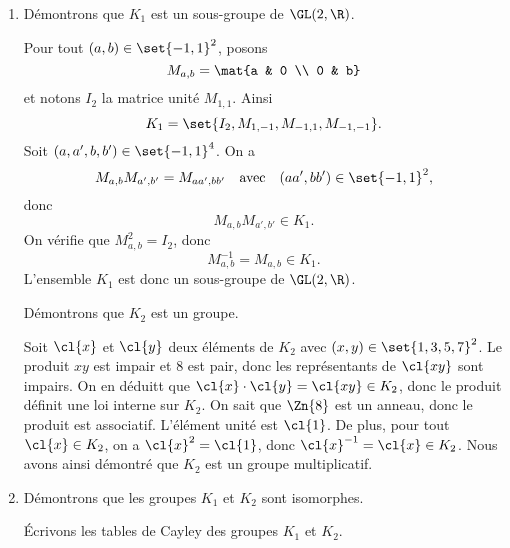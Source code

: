 \begin{enumerate}
  \item 
    Démontrons que $K_1$ est un sous-groupe de $\GL(2,\R)$.

    Pour tout $(a,b)\in\set{-1,1}^2$, posons 
    \[
      M_{a,b} = \mat{a & 0 \\ 0 & b}
    \]
    et notons $I_2$ la matrice unité $M_{1,1}$. Ainsi
    \[
      K_1 = \set{I_2, M_{1,-1}, M_{-1,1}, M_{-1,-1}}.
    \]
    Soit $(a,a',b,b')\in\set{-1,1}^4$. On a
    \[
      M_{a,b} M_{a',b'} = M_{aa',bb'}\quad\text{avec}\quad (aa',bb')\in\set{-1,1}^2, 
    \]
    donc 
    \[
      M_{a,b}M_{a',b'} \in K_1.
    \]
    On vérifie que $M_{a,b}^2 = I_2$, donc
    \[
      M_{a,b}^{-1} = M_{a,b}\in K_1.
    \]
    L'ensemble $K_1$ est donc un sous-groupe de $\GL(2,\R)$.

    Démontrons que $K_2$ est un groupe.  
    
    Soit $\cl{x}$ et $\cl{y}$ deux éléments de $K_2$ avec $(x,y)\in\set{1,3,5,7}^2$. 
    Le produit $xy$ est impair et $8$ est pair, donc les représentants de
    $\cl{xy}$ sont impairs. On en déduitt que $\cl{x}\cdot\cl{y} =
    \cl{xy}\in K_2$, donc le produit définit une loi interne sur $K_2$. On sait
    que $\Zn{8}$ est un anneau, donc le produit est associatif. L'élément unité
    est $\cl{1}$.  De plus, pour tout $\cl{x}\in K_2$, on a $\cl{x}^2 = \cl{1}$,
    donc $\cl{x}^{-1} = \cl{x}\in K_2$. Nous avons ainsi démontré que $K_2$ est
    un groupe multiplicatif.

  \item 
    Démontrons que les groupes $K_1$ et $K_2$ sont isomorphes.

    Écrivons les tables de Cayley des groupes $K_1$ et $K_2$.
    

\end{enumerate}
